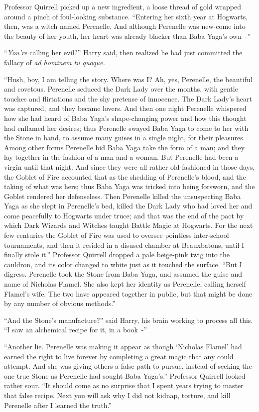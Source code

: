 Professor Quirrell picked up a new ingredient, a loose thread of gold wrapped around a pinch of foul-looking substance. ``Entering her sixth year at Hogwarts, then, was a witch named Perenelle. And although Perenelle was new-come into the beauty of her youth, her heart was already blacker than Baba Yaga's own~-''

``\emph{You're} calling her evil?'' Harry said, then realized he had just committed the fallacy of \emph{ad hominem tu quoque.}

``Hush, boy, I am telling the story. Where was I? Ah, yes, Perenelle, the beautiful and covetous. Perenelle seduced the Dark Lady over the months, with gentle touches and flirtations and the shy pretense of innocence. The Dark Lady's heart was captured, and they became lovers. And then one night Perenelle whispered how she had heard of Baba Yaga's shape-changing power and how this thought had enflamed her desires; thus Perenelle swayed Baba Yaga to come to her with the Stone in hand, to assume many guises in a single night, for their pleasures. Among other forms Perenelle bid Baba Yaga take the form of a man; and they lay together in the fashion of a man and a woman. But Perenelle had been a virgin until that night. And since they were all rather old-fashioned in those days, the Goblet of Fire accounted that as the shedding of Perenelle's blood, and the taking of what was hers; thus Baba Yaga was tricked into being forsworn, and the Goblet rendered her defenseless. Then Perenelle killed the unsuspecting Baba Yaga as she slept in Perenelle's bed, killed the Dark Lady who had loved her and come peacefully to Hogwarts under truce; and that was the end of the pact by which Dark Wizards and Witches taught Battle Magic at Hogwarts. For the next few centuries the Goblet of Fire was used to oversee pointless inter-school tournaments, and then it resided in a disused chamber at Beauxbatons, until I finally stole it.'' Professor Quirrell dropped a pale beige-pink twig into the cauldron, and its color changed to white just as it touched the surface. ``But I digress. Perenelle took the Stone from Baba Yaga, and assumed the guise and name of Nicholas Flamel. She also kept her identity as Perenelle, calling herself Flamel's wife. The two have appeared together in public, but that might be done by any number of obvious methods.''

``And the Stone's manufacture?'' said Harry, his brain working to process all this. ``I saw an alchemical recipe for it, in a book~-''

``Another lie. Perenelle was making it appear as though `Nicholas Flamel' had earned the right to live forever by completing a great magic that any could attempt. And she was giving others a false path to pursue, instead of seeking the one true Stone as Perenelle had sought Baba Yaga's.'' Professor Quirrell looked rather sour. ``It should come as no surprise that I spent years trying to master that false recipe. Next you will ask why I did not kidnap, torture, and kill Perenelle after I learned the truth.''

